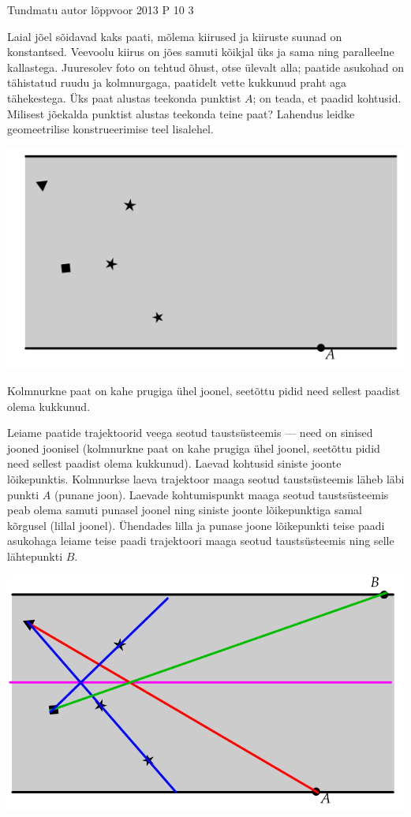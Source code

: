 {Tundmatu autor} %
{lõppvoor} %
{2013} %
{P 10} %
{3} %
{

\ifStatement
 Laial jõel sõidavad kaks paati, mõlema kiirused ja kiiruste suunad on konstantsed. Veevoolu kiirus on jões samuti kõikjal üks ja sama ning paralleelne kallastega. Juuresolev foto on tehtud õhust, otse ülevalt alla; paatide asukohad on tähistatud ruudu ja kolmnurgaga, paatidelt vette kukkunud praht aga tähekestega. Üks paat alustas teekonda punktist $A$; on teada, et paadid kohtusid. Milisest jõekalda punktist alustas teekonda teine paat? Lahendus leidke geomeetrilise konstrueerimise teel lisalehel.
\begin{center}
	\includegraphics[width=0.5\linewidth]{2013-v3p-10-yl.PNG}
\end{center}
\fi

\ifHint
Kolmnurkne paat on kahe prugiga ühel joonel, seetõttu pidid need sellest paadist olema kukkunud.
\fi

\ifSolution
Leiame paatide trajektoorid veega seotud taustsüsteemis — need on sinised jooned joonisel (kolmnurkne paat on kahe prugiga ühel joonel, seetõttu pidid need sellest paadist olema kukkunud). Laevad kohtusid siniste joonte lõikepunktis. Kolmnurkse laeva trajektoor maaga seotud taustsüsteemis läheb läbi punkti $A$ (punane joon). Laevade kohtumispunkt maaga seotud taustsüsteemis peab olema samuti punasel joonel ning siniste joonte lõikepunktiga samal kõrgusel (lillal joonel). Ühendades lilla ja punase joone lõikepunkti teise paadi asukohaga leiame teise paadi trajektoori maaga seotud taustsüsteemis ning selle lähtepunkti $B$.
\begin{center}
	\includegraphics[width=0.5\linewidth]{2013-v3p-10-lah.PNG}
\end{center}
\fi
}
